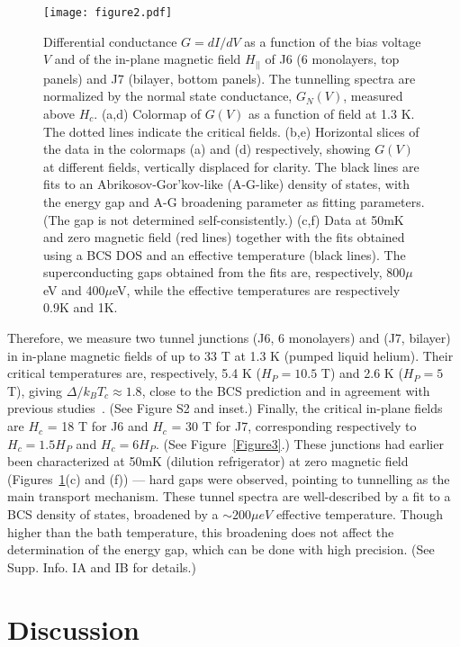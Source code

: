 \documentclass[showpacs,superscriptaddress,preprint,prb]{revtex4}
\begin{document}
 \begin{figure}[h!]
	\texttt{[image: figure2.pdf]}	 
	\caption{Differential conductance $G = dI/dV$ as a function of the bias voltage $V$ and of the in-plane magnetic field $H_{||}$ of J6 (6 monolayers, top panels) and J7 (bilayer, bottom panels). The tunnelling spectra are normalized by the normal state conductance, $G_N(V)$, measured above $H_c$. (a,d) Colormap of $G(V)$ as a function of field at 1.3 K. The dotted lines indicate the critical fields. (b,e) Horizontal slices of the data in the colormaps (a) and (d) respectively, showing $G(V)$ at different fields, vertically displaced for clarity. The black lines are fits to an Abrikosov-Gor'kov-like (A-G-like) density of states, with the energy gap and A-G broadening parameter as fitting parameters. (The gap is not determined self-consistently.) (c,f) Data at 50mK and zero magnetic field (red lines) together with the fits obtained using a BCS DOS and an effective temperature (black lines). The superconducting gaps obtained from the fits are, respectively, 800$\mu$eV and 400$\mu$eV, while the effective temperatures are respectively 0.9K and 1K.}
	\label{Figure2}
\end{figure}

Therefore, we measure two tunnel junctions (J6, 6 monolayers) and (J7, bilayer) in in-plane magnetic fields of up to 33 T at 1.3 K (pumped liquid helium). Their critical temperatures are, respectively, 5.4 K ($H_P = 10.5$ T) and 2.6 K ($H_P = 5$ T), giving $\Delta/k_B T_c\approx 1.8$, close to the BCS prediction and in agreement with previous studies~\cite{dvir,khestanova2018}. (See Figure S2 and inset.) Finally, the critical in-plane fields are $H_c$ = 18 T for J6 and $H_c$ = 30 T for J7, corresponding respectively to $H_c=1.5 H_P$ and $H_c=6 H_P$. (See Figure~\ref{Figure3}.) These junctions had earlier been characterized at 50mK (dilution refrigerator) at zero magnetic field (Figures~\ref{Figure2}(c) and (f)) --- hard gaps were observed, pointing to tunnelling as the main transport mechanism. These tunnel spectra are well-described by a fit to a BCS density of states, broadened by a $\sim 200\mu eV$ effective temperature. Though higher than the bath temperature, this broadening does not affect the determination of the energy gap, which can be done with high precision. (See Supp. Info. IA and IB for details.)

\section{Discussion}
\end{document}
